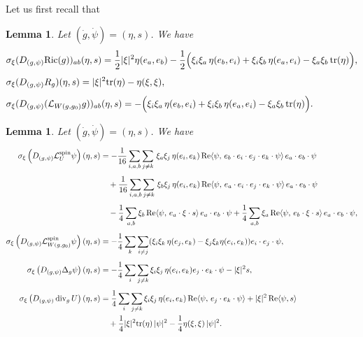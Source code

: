 \documentclass{amsart}
\newtheorem{lemma}[theorem]{Lemma}
\theoremstyle{definition}
\theoremstyle{remark}
\numberwithin{equation}{section}
\newcommand{\tr}{\textup{tr}}
\newcommand{\Ric}{\textup{Ric}}
\renewcommand{\div}{\,\textup{div}}
\begin{document}
Let us first recall that

\begin{lemma}\label{lem;Ricci;symbols}
	Let $(\dot{g}, \dot{\psi}) = (\eta, s)$. We have
		\begin{align*}
			&\sigma_{\xi}(D_{(g,\psi)}\Ric(g))_{ab}(\eta,s) = \frac{1}{2}|\xi|^2\eta(e_a,e_b) - \frac{1}{2}\Big(\xi_i\xi_a\,\eta(e_b,e_i) +  \xi_i\xi_b\,\eta(e_a,e_i) - \xi_a\xi_b\,\tr(\eta)\Big),\\[1ex]
			&\sigma_{\xi}(D_{(g,\psi)}R_g)(\eta,s) = |\xi|^2\tr(\eta) - \eta(\xi,\xi),\\[1ex]
			&\sigma_{\xi}(D_{(g,\psi)}(\mathcal{L}_{W(g,g_0)}g))_{ab}(\eta,s) = -\Big(\xi_i\xi_a\,\eta(e_b,e_i) +  \xi_i\xi_b\,\eta(e_a,e_i) - \xi_a\xi_b\,\tr(\eta)\Big).
		\end{align*}
\end{lemma}


\begin{lemma}\label{lem;symbol_2}
	Let $(\dot{g}, \dot{\psi}) = (\eta, s)$. We have
	\begin{align*}
		\sigma_{\xi}\left(  D_{(g,\psi)} \mathcal{L}_{U}^{\text{spin}}\psi \right)(\eta,s)
		&  = -\frac{1}{16}\sum_{i,a,b}\sum_{j\neq k}\, \xi_a\xi_j\, \eta(e_i, e_k)\, \textup{Re}\langle \psi,\, e_b\cdot e_i\cdot e_j\cdot e_k\cdot\psi\rangle \, e_a\cdot e_b\cdot \psi\\[1ex]
		&\quad  + \frac{1}{16}\sum_{i,a,b}\sum_{j\neq k}\, \xi_b\xi_j\, \eta (e_i, e_k)\, \textup{Re}\langle \psi,\, e_a\cdot e_i\cdot e_j\cdot e_k\cdot\psi\rangle \, e_a\cdot e_b\cdot\psi\\[1ex]
		&\quad -  \frac{1}{4}\sum_{a, b}\xi_b\, \textup{Re}\langle\psi,\, e_a\cdot \xi\cdot s\rangle \, e_a\cdot e_b\cdot \psi +  \frac{1}{4}\sum_{a, b} \xi_a\, \textup{Re}\langle\psi,\, e_b\cdot \xi\cdot s\rangle  \, e_a\cdot e_b\cdot \psi,\\[1ex]
		\sigma_{\xi}\left( D_{(g,\psi)} \mathcal{L}_{W(g,g_0) }^{\text{spin}}\psi \right)(\eta,s) &= -\frac{1}{4} \sum_k\sum_{i\neq j}(\xi_i\xi_k\,\eta(e_j, e_k) - \xi_j\xi_k\eta(e_i, e_k))e_i\cdot e_j\cdot \psi,\\[1ex]
	\sigma_{\xi}\left( D_{(g,\psi)}\Delta_g\psi \right)(\eta,s) &= -\frac{1}{4}\sum_i\sum_{j\neq k}\xi_i\xi_j\, \eta(e_i,e_k)e_j\cdot e_k\cdot\psi - |\xi|^2 s,\\[1ex]
	\sigma_{\xi}\left( D_{(g,\psi)}\div_g\, U \right)(\eta,s) &=  \frac{1}{4}\sum_i\sum_{j\neq k}\xi_i\xi_j\, \eta(e_i,e_k)\, \text{Re}\langle\psi,\,e_j\cdot e_k\cdot\psi\rangle + |\xi|^2\,\text{Re}\langle\psi, s\rangle\\
	&\quad  + \frac{1}{4}|\xi|^2\tr(\eta)\,|\psi|^2 -  \frac{1}{4}\eta(\xi,\xi)\,|\psi|^2.
	\end{align*}

\end{lemma}
\end{document}
